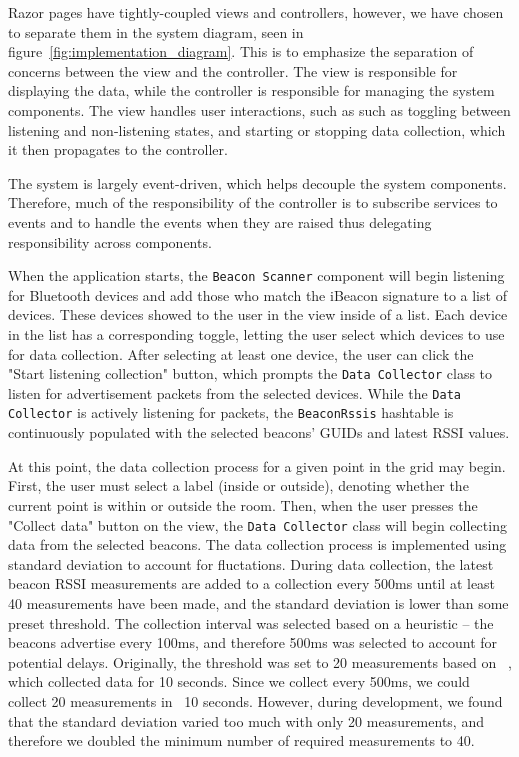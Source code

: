 Razor pages have tightly-coupled views and controllers, however, we have chosen to separate them in the system diagram, seen in figure~\ref{fig:implementation_diagram}. This is to emphasize the separation of concerns between the view and the controller. The view is responsible for displaying the data, while the controller is responsible for managing the system components. The view handles user interactions, such as such as toggling between listening and non-listening states, and starting or stopping data collection, which it then propagates to the controller.

The system is largely event-driven, which helps decouple the system components. 
Therefore, much of the responsibility of the controller is to subscribe services to events and to handle the events when they are raised thus delegating responsibility across components. 

When the application starts, the \texttt{Beacon Scanner} component will begin listening for Bluetooth devices and add those who match the iBeacon signature to a list of devices.
These devices showed to the user in the view inside of a list.
Each device in the list has a corresponding toggle, letting the user select which devices to use for data collection.
After selecting at least one device, the user can click the "Start listening collection" button, which prompts the \texttt{Data Collector} class to listen for advertisement packets from the selected devices. 
While the \texttt{Data Collector} is actively listening for packets, the \texttt{BeaconRssis} hashtable is continuously populated with the selected beacons' GUIDs and latest RSSI values.


At this point, the data collection process for a given point in the grid may begin.
First, the user must select a label (inside or outside), denoting whether the current point is within or outside the room.
Then, when the user presses the "Collect data" button on the view, the \texttt{Data Collector} class will begin collecting data from the selected beacons.
The data collection process is implemented using standard deviation to account for fluctations.
During data collection, the latest beacon RSSI measurements are added to a collection every 500ms until at least 40 measurements have been made, and the standard deviation is lower than some preset threshold.
The collection interval was selected based on a heuristic -- the beacons advertise every 100ms, and therefore 500ms was selected to account for potential delays.
Originally, the threshold was set to 20 measurements based on \citeauthor{improving_indoor_localization}~\cite{improving_indoor_localization}, which collected data for 10 seconds.
Since we collect every 500ms, we could collect 20 measurements in ~10 seconds. However, during development, we found that the standard deviation varied too much with only 20 measurements, and therefore we doubled the minimum number of required measurements to 40.

